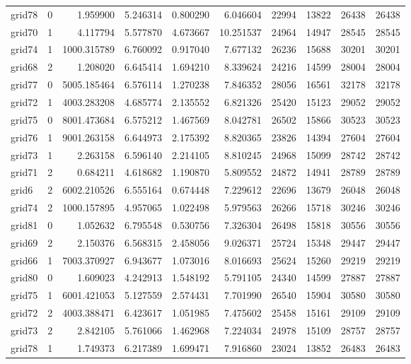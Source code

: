 \begin{longtable}{|l|r|r|r|r|r|r|r|r|r|}
grid78 & 0 & 1.959900 & 5.246314 & 0.800290 & 6.046604 & 22994 & 13822 & 26438 & 26438 \\
grid70 & 1 & 4.117794 & 5.577870 & 4.673667 & 10.251537 & 24964 & 14947 & 28545 & 28545 \\
grid74 & 1 & 1000.315789 & 6.760092 & 0.917040 & 7.677132 & 26236 & 15688 & 30201 & 30201 \\
grid68 & 2 & 1.208020 & 6.645414 & 1.694210 & 8.339624 & 24216 & 14599 & 28004 & 28004 \\
grid77 & 0 & 5005.185464 & 6.576114 & 1.270238 & 7.846352 & 28056 & 16561 & 32178 & 32178 \\
grid72 & 1 & 4003.283208 & 4.685774 & 2.135552 & 6.821326 & 25420 & 15123 & 29052 & 29052 \\
grid75 & 0 & 8001.473684 & 6.575212 & 1.467569 & 8.042781 & 26502 & 15866 & 30523 & 30523 \\
grid76 & 1 & 9001.263158 & 6.644973 & 2.175392 & 8.820365 & 23826 & 14394 & 27604 & 27604 \\
grid73 & 1 & 2.263158 & 6.596140 & 2.214105 & 8.810245 & 24968 & 15099 & 28742 & 28742 \\
grid71 & 2 & 0.684211 & 4.618682 & 1.190870 & 5.809552 & 24872 & 14941 & 28789 & 28789 \\
grid6 & 2 & 6002.210526 & 6.555164 & 0.674448 & 7.229612 & 22696 & 13679 & 26048 & 26048 \\
grid74 & 2 & 1000.157895 & 4.957065 & 1.022498 & 5.979563 & 26266 & 15718 & 30246 & 30246 \\
grid81 & 0 & 1.052632 & 6.795548 & 0.530756 & 7.326304 & 26498 & 15818 & 30556 & 30556 \\
grid69 & 2 & 2.150376 & 6.568315 & 2.458056 & 9.026371 & 25724 & 15348 & 29447 & 29447 \\
grid66 & 1 & 7003.370927 & 6.943677 & 1.073016 & 8.016693 & 25624 & 15260 & 29219 & 29219 \\
grid80 & 0 & 1.609023 & 4.242913 & 1.548192 & 5.791105 & 24340 & 14599 & 27887 & 27887 \\
grid75 & 1 & 6001.421053 & 5.127559 & 2.574431 & 7.701990 & 26540 & 15904 & 30580 & 30580 \\
grid72 & 2 & 4003.388471 & 6.423617 & 1.051985 & 7.475602 & 25458 & 15161 & 29109 & 29109 \\
grid73 & 2 & 2.842105 & 5.761066 & 1.462968 & 7.224034 & 24978 & 15109 & 28757 & 28757 \\
grid78 & 1 & 1.749373 & 6.217389 & 1.699471 & 7.916860 & 23024 & 13852 & 26483 & 26483 \\

\end{longtable}
